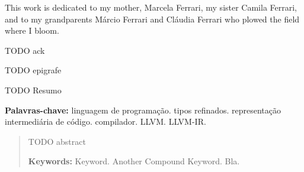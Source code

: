 \documentclass[
  oneside,
  english,
  coorientadorbanca,
  noabntexcite
]{ufsc-thesis-rn46-2019}
\begin{document}

\pretextual{}
\imprimircapa{}
\imprimirfolhaderosto*
\protect{}%
\imprimirfolhadecertificacao{}



\begin{dedicatoria}
  This work is dedicated to my mother, Marcela Ferrari, my sister Camila Ferrari, and to my grandparents Márcio Ferrari and Cláudia Ferrari who plowed the field where I bloom.
\end{dedicatoria}

\begin{agradecimentos}
  TODO ack
\end{agradecimentos}

\begin{epigrafe}
  TODO epigrafe
\end{epigrafe}

\begin{resumo}[Resumo]
  TODO Resumo

  \vspace{\baselineskip}
  \textbf{Palavras-chave:} linguagem de programação\@. tipos refinados\@. representação intermediária de código\@. compilador\@. LLVM\@. LLVM-IR\@.
\end{resumo}

\begin{abstract}
  TODO abstract

  \vspace{\baselineskip}
  \textbf{Keywords:} Keyword. Another Compound Keyword. Bla.
\end{abstract}

\listoffigures*  %
\end{document}
